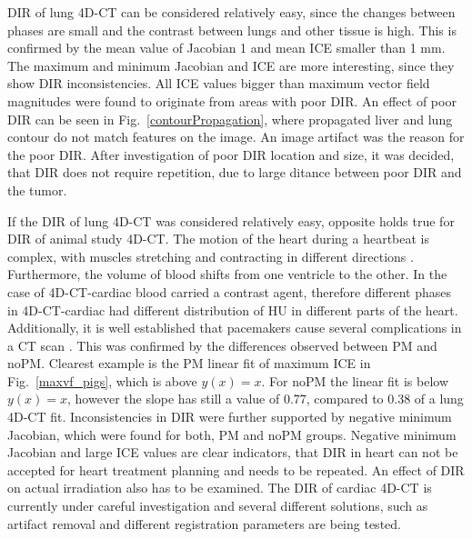 DIR of lung 4D-CT can be considered relatively easy, since the changes between phases are small and the contrast between lungs and other tissue is high. 
This is confirmed by the mean value of Jacobian 1 and mean ICE smaller than 1 mm. The maximum and minimum Jacobian and ICE are more interesting, since they show 
DIR inconsistencies. All ICE values bigger than maximum vector field magnitudes were found to originate from areas with poor DIR. An effect of poor DIR can be seen in Fig.~\ref{contourPropagation},
where propagated liver and lung contour do not match features on the image. An image artifact was the reason for the poor DIR. After investigation of poor DIR location and size, 
it was decided, that DIR does not require repetition, due to large ditance between poor DIR and the tumor.

If the DIR of lung 4D-CT was considered relatively easy, opposite holds true for DIR of animal study 4D-CT. The motion of the heart during a heartbeat is complex, 
with muscles stretching and contracting in different directions \cite{Seeley2007}. Furthermore,
the volume of blood shifts from one ventricle to the other. In the case of 4D-CT-cardiac blood carried a contrast agent, therefore different phases in 4D-CT-cardiac 
had different distribution of HU in different parts of the heart. Additionally, it is well established that pacemakers cause several complications in a CT scan \cite{Mak2012}. This was
confirmed by the differences observed between PM and noPM. Clearest example is the PM linear fit of maximum ICE in Fig.~\ref{maxvf_pigs}, which is above $y(x) = x$. For noPM the linear
fit is below $y(x)=x$, however the slope has still a value of 0.77, compared to 0.38 of a lung 4D-CT fit. Inconsistencies in DIR were further supported by negative minimum Jacobian, which were found for both,
PM and noPM groups. Negative minimum Jacobian and large ICE values are clear indicators, that DIR in heart can not be 
accepted for heart treatment planning and needs to be repeated. An effect of DIR on actual irradiation also has to be examined.
The DIR of cardiac 4D-CT is currently under careful investigation
and several different solutions, such as artifact removal and different registration parameters are being tested.

